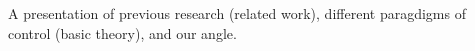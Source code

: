 A presentation of previous research (related work), different paragdigms of control (basic theory), and our angle.